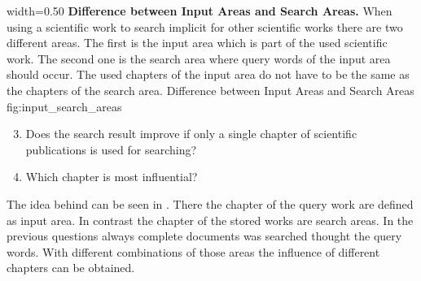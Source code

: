      {width=0.50\textwidth}
      {\textbf{Difference between Input Areas and Search Areas.} When using a scientific work to search implicit for other scientific works there are two different areas. The first is the input area which is part of the used scientific work. The second one is the search area where query words of the input area should occur. The used chapters of the input area do not have to be the same as the chapters of the search area.}
      {Difference between Input Areas and Search Areas}
      {fig:input_search_areas}

\begin{enumerate}[label=1.\arabic*]
  \setcounter{enumi}{2}
    \item Does the search result improve if only a single chapter of scientific publications is used for searching?
    \item Which chapter is most influential?
\end{enumerate}

The idea behind can be seen in . There the chapter of the query work are defined as input area. In contrast the chapter of the stored works are search areas. In the previous questions always complete documents was searched thought the query words. With different combinations of those areas the influence of different chapters can be obtained.

